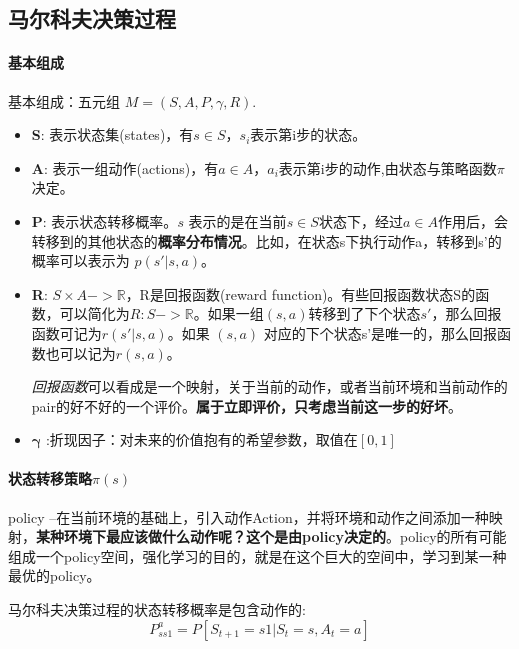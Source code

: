\documentclass[UTF8,a4paper,12pt]{ctexbook}
\begin{document}
		\subsection{马尔科夫决策过程}
		
			\paragraph{基本组成}
			基本组成：五元组 $M=(S,A,P,\gamma,R)$.
								
			\begin{itemize}[itemindent = 1em]
				\item \textbf{S}: 表示状态集(states)，有$s \in S$，$s_i$表示第i步的状态。
				
				\item \textbf{A}: 表示一组动作(actions)，有$a \in A$，$a_i$表示第i步的动作,由状态与策略函数$\pi$ 决定。
				
				\item \textbf{P}: 表示状态转移概率。$s$ 表示的是在当前$s \in S$状态下，经过$a \in A$作用后，会转移到的其他状态的\textbf{概率分布情况}。比如，在状态s下执行动作a，转移到s'的概率可以表示为 $p(s'|s,a)$。
				
				\item \textbf{R}: $S \times A->\mathbb{R}$，R是回报函数(reward function)。有些回报函数状态S的函数，可以简化为$R:S->\mathbb{R}$。如果一组$(s,a)$转移到了下个状态$s'$，那么回报函数可记为$r(s'|s, a)$。如果 $(s,a)$ 对应的下个状态s'是唯一的，那么回报函数也可以记为$r(s,a)$。
				
				\textit{回报函数}可以看成是一个映射，关于当前的动作，或者当前环境和当前动作的pair的好不好的一个评价。\textbf{属于立即评价，只考虑当前这一步的好坏}。
				
				\item $\mathbf{\gamma}$ :折现因子：对未来的价值抱有的希望参数，取值在$[0,1]$
			\end{itemize}
			
			
			\paragraph{状态转移策略$\pi(s)$}	
				policy --在当前环境的基础上，引入动作Action，并将环境和动作之间添加一种映射，\textbf{某种环境下最应该做什么动作呢？这个是由policy决定的}。policy的所有可能组成一个policy空间，强化学习的目的，就是在这个巨大的空间中，学习到某一种最优的policy。
			
			
				马尔科夫决策过程的状态转移概率是包含动作的:
				$$ P_{ss1}^a = P[S_{t+1} = s1 | S_t = s, A_t = a]$$
				
\end{document}
